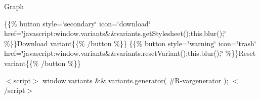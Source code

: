 Graph

\{\{\% button style=\char`\"{}secondary\char`\"{} icon=\char`\"{}download\char`\"{} href=\char`\"{}javascript\+:window.\+variants\&\&variants.\+get\+Stylesheet();this.\+blur();\char`\"{} \%\}\}Download variant\{\{\% /button \%\}\} \{\{\% button style=\char`\"{}warning\char`\"{} icon=\char`\"{}trash\char`\"{} href=\char`\"{}javascript\+:window.\+variants\&\&variants.\+reset\+Variant();this.\+blur();\char`\"{} \%\}\}Reset variant\{\{\% /button \%\}\}

$<$script$>$ window.\+variants \&\& variants.\+generator( \textquotesingle{}\#R-\/vargenerator\textquotesingle{} ); $<$/script$>$ 